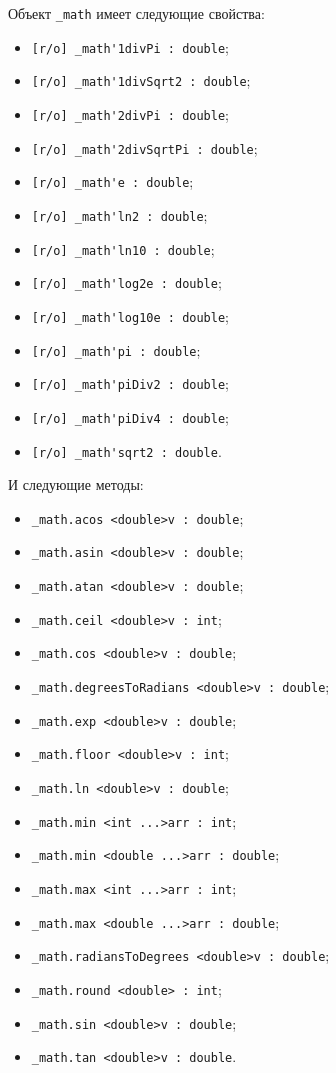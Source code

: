 \documentclass[a4paper, 14pt]{extarticle}
\newenvironment{icItems}
	{ \begin{itemize} [noitemsep,nolistsep] }
	{ \end{itemize} }
\begin{document}
Объект \lstinline|_math| имеет следующие свойства:
\begin{icItems}
	\item \lstinline|[r/o] _math'1divPi : double|;
	\item \lstinline|[r/o] _math'1divSqrt2 : double|;
	\item \lstinline|[r/o] _math'2divPi : double|;
	\item \lstinline|[r/o] _math'2divSqrtPi : double|;
	\item \lstinline|[r/o] _math'e : double|;
	\item \lstinline|[r/o] _math'ln2 : double|;
	\item \lstinline|[r/o] _math'ln10 : double|;
	\item \lstinline|[r/o] _math'log2e : double|;
	\item \lstinline|[r/o] _math'log10e : double|;
	\item \lstinline|[r/o] _math'pi : double|;
	\item \lstinline|[r/o] _math'piDiv2 : double|;
	\item \lstinline|[r/o] _math'piDiv4 : double|;
	\item \lstinline|[r/o] _math'sqrt2 : double|.
\end{icItems}

И следующие методы:
\begin{icItems}
	\item \lstinline|_math.acos <double>v : double|;
	\item \lstinline|_math.asin <double>v : double|;
	\item \lstinline|_math.atan <double>v : double|;
	\item \lstinline|_math.ceil <double>v : int|;
	\item \lstinline|_math.cos <double>v : double|;
	\item \lstinline|_math.degreesToRadians <double>v : double|;
	\item \lstinline|_math.exp <double>v : double|;
	\item \lstinline|_math.floor <double>v : int|;
	\item \lstinline|_math.ln <double>v : double|;
	\item \lstinline|_math.min <int ...>arr : int|;
	\item \lstinline|_math.min <double ...>arr : double|;
	\item \lstinline|_math.max <int ...>arr : int|;
	\item \lstinline|_math.max <double ...>arr : double|;
	\item \lstinline|_math.radiansToDegrees <double>v : double|;
	\item \lstinline|_math.round <double> : int|;
	\item \lstinline|_math.sin <double>v : double|;
	\item \lstinline|_math.tan <double>v : double|.
\end{icItems}
\end{document}
